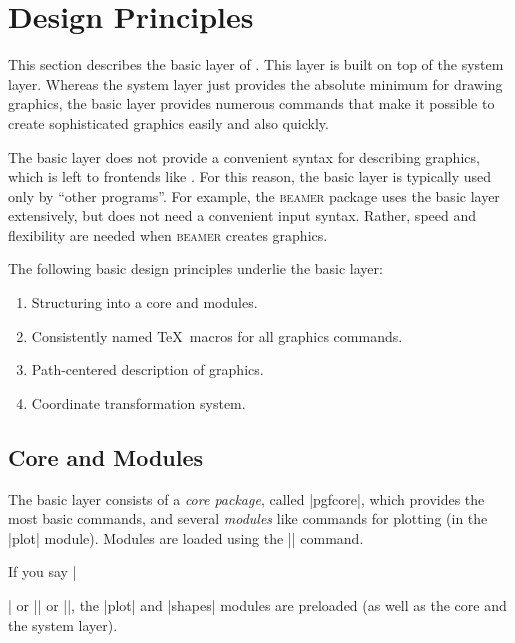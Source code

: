 %
%
%


\section[base-design]{Design Principles}

This section describes the basic layer of \pgfname. This layer is built on top
of the system layer. Whereas the system layer just provides the absolute
minimum for drawing graphics, the basic layer provides numerous commands that
make it possible to create sophisticated graphics easily and also quickly.

The basic layer does not provide a convenient syntax for describing graphics,
which is left to frontends like \tikzname. For this reason, the basic layer is
typically used only by ``other programs''. For example, the \textsc{beamer}
package uses the basic layer extensively, but does not need a convenient input
syntax. Rather, speed and flexibility are needed when \textsc{beamer} creates
graphics.

The following basic design principles underlie the basic layer:
%
\begin{enumerate}
    \item Structuring into a core and modules.
    \item Consistently named \TeX\ macros for all graphics commands.
    \item Path-centered description of graphics.
    \item Coordinate transformation system.
\end{enumerate}


\subsection{Core and Modules}

The basic layer consists of a \emph{core package}, called |pgfcore|, which
provides the most basic commands, and several \emph{modules} like commands for
plotting (in the |plot| module). Modules are loaded using the |\usepgfmodule|
command.

If you say |\usepackage{pgf}| or || or |\usemodule[pgf]|, the
|plot| and |shapes| modules are preloaded (as well as the core and the system
layer).



